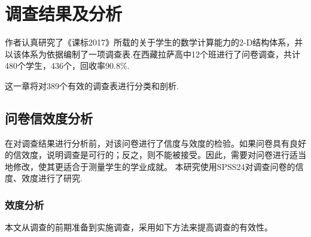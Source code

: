 \chapter{调查结果及分析}



作者认真研究了《课标2017》所载的关于学生的数学计算能力的2-D结构体系，并以该体系为依据编制了一项调查表.在西藏拉萨高中12个班进行了问卷调查，共计480个学生，436个，回收率90.8\%.

这一章将对389个有效的调查表进行分类和剖析.

\section{问卷信效度分析}

在对调查结果进行分析前，对该问卷进行了信度与效度的检验。如果问卷具有良好的信效度，说明调查是可行的；反之，则不能被接受。因此，需要对问卷进行适当地修改，使其更适合于测量学生的学业成就。 本研究使用SPSS24对调查问卷的信度、效度进行了研究.


\subsection{效度分析}

本文从调查的前期准备到实施调查，采用如下方法来提高调查的有效性。


